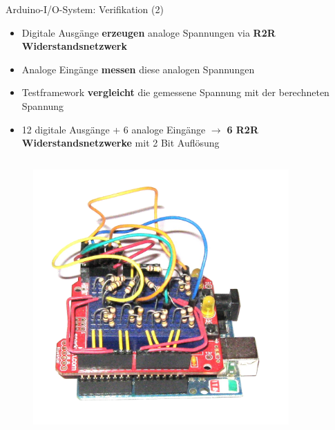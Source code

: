 \documentclass{beamer}
\begin{document}
\begin{frame}{Arduino-I/O-System: Verifikation (2)}
	\begin{itemize}
		\item Digitale Ausg\"ange \textbf{erzeugen} analoge Spannungen via \textbf{R2R Widerstandsnetzwerk}
		\item Analoge Eing\"ange \textbf{messen} diese analogen Spannungen
		\item Testframework \textbf{vergleicht} die gemessene Spannung mit der berechneten Spannung
	\end{itemize}
	\begin{itemize}
		\item 12 digitale Ausg\"ange + 6 analoge Eing\"ange $\rightarrow$ \textbf{6 R2R Widerstandsnetzwerke} mit 2 Bit Aufl\"osung
	\end{itemize}
	\begin{columns}
		\begin{column}{0.4\textwidth}
			\begin{figure}[htbp]
				\centering
				\includegraphics[scale=0.2]{./images/arduinoio-r2r.png}
			\end{figure}
		\end{column}
		\begin{column}{0.4\textwidth}
			\begin{figure}[htbp]
				\centering

\end{figure}
\end{column}
\end{columns}
\end{frame}
\end{document}

